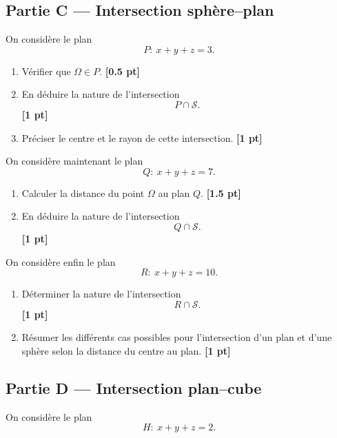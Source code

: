 \documentclass[11pt,a4paper]{article}
\newcommand{\Sphere}{\mathcal{S}}
\newcommand{\barq}[1]{\hfill{\small\textbf{[#1 pt]}}}
\begin{document}
\subsection*{Partie C --- Intersection sphère--plan}

On considère le plan
\[
P:\ x+y+z=3.
\]

\begin{enumerate}[label=\textbf{\arabic*.},resume]
    \item Vérifier que \(\Omega\in P\). \barq{0.5}

    \item En déduire la nature de l'intersection
    \[
    P\cap \Sphere.
    \]
    \barq{1}

    \item Préciser le centre et le rayon de cette intersection. \barq{1}
\end{enumerate}

On considère maintenant le plan
\[
Q:\ x+y+z=7.
\]

\begin{enumerate}[label=\textbf{\arabic*.},resume]
    \item Calculer la distance du point \(\Omega\) au plan \(Q\). \barq{1.5}

    \item En déduire la nature de l'intersection
    \[
    Q\cap \Sphere.
    \]
    \barq{1}
\end{enumerate}

On considère enfin le plan
\[
R:\ x+y+z=10.
\]

\begin{enumerate}[label=\textbf{\arabic*.},resume]
    \item Déterminer la nature de l'intersection
    \[
    R\cap \Sphere.
    \]
    \barq{1}

    \item Résumer les différents cas possibles pour l'intersection d'un plan et d'une sphère selon la distance du centre au plan. \barq{1}
\end{enumerate}

\subsection*{Partie D --- Intersection plan--cube}

On considère le plan
\[
H:\ x+y+z=2.
\]
\end{document}
